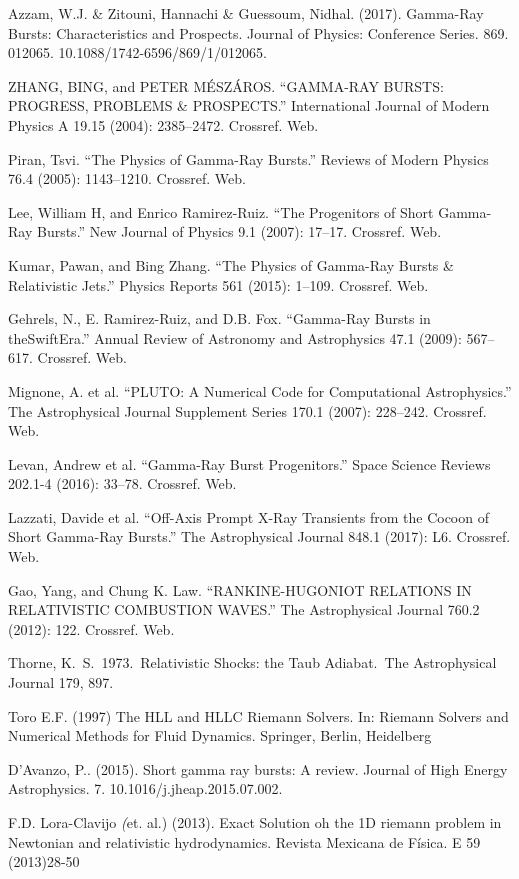 \documentclass[12pt,a4paper]{book}
\begin{document}
\begin{thebibliography}{20}
Azzam, W.J. \& Zitouni, Hannachi \& Guessoum, Nidhal. (2017). Gamma-Ray Bursts: Characteristics and Prospects. Journal of Physics: Conference Series. 869. 012065. 10.1088/1742-6596/869/1/012065. 

ZHANG, BING, and PETER MÉSZÁROS. “GAMMA-RAY BURSTS: PROGRESS, PROBLEMS \& PROSPECTS.” International Journal of Modern Physics A 19.15 (2004): 2385–2472. Crossref. Web.

Piran, Tsvi. “The Physics of Gamma-Ray Bursts.” Reviews of Modern Physics 76.4 (2005): 1143–1210. Crossref. Web.

Lee, William H, and Enrico Ramirez-Ruiz. “The Progenitors of Short Gamma-Ray Bursts.” New Journal of Physics 9.1 (2007): 17–17. Crossref. Web.

Kumar, Pawan, and Bing Zhang. “The Physics of Gamma-Ray Bursts \& Relativistic Jets.” Physics Reports 561 (2015): 1–109. Crossref. Web.

Gehrels, N., E. Ramirez-Ruiz, and D.B. Fox. “Gamma-Ray Bursts in theSwiftEra.” Annual Review of Astronomy and Astrophysics 47.1 (2009): 567–617. Crossref. Web.

Mignone, A. et al. “PLUTO: A Numerical Code for Computational Astrophysics.” The Astrophysical Journal Supplement Series 170.1 (2007): 228–242. Crossref. Web.

Levan, Andrew et al. “Gamma-Ray Burst Progenitors.” Space Science Reviews 202.1-4 (2016): 33–78. Crossref. Web.

Lazzati, Davide et al. “Off-Axis Prompt X-Ray Transients from the Cocoon of Short Gamma-Ray Bursts.” The Astrophysical Journal 848.1 (2017): L6. Crossref. Web.

Gao, Yang, and Chung K. Law. “RANKINE-HUGONIOT RELATIONS IN RELATIVISTIC COMBUSTION WAVES.” The Astrophysical Journal 760.2 (2012): 122. Crossref. Web.

 Thorne, K.~S.\ 1973.\ Relativistic Shocks: the Taub Adiabat.\ The Astrophysical Journal 179, 897.

Toro E.F. (1997) The HLL and HLLC Riemann Solvers. In: Riemann Solvers and Numerical Methods for Fluid Dynamics. Springer, Berlin, Heidelberg

D'Avanzo, P.. (2015). Short gamma ray bursts: A review. Journal of High Energy Astrophysics. 7. 10.1016/j.jheap.2015.07.002. 

F.D. Lora-Clavijo \emph(et. al.) (2013). Exact Solution oh the 1D riemann problem in Newtonian and relativistic hydrodynamics. Revista Mexicana de Física. E 59 (2013)28-50 
\end{thebibliography}
\end{document}
